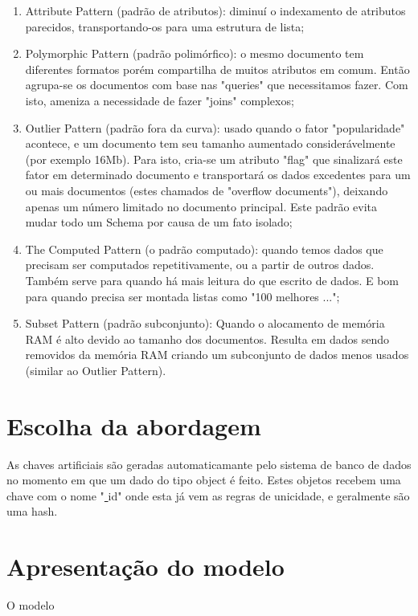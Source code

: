\documentclass[
	12pt,				%
	openright,			%
	oneside,			%
	a4paper,			%
	english,			%
	french,				%
	spanish,			%
	brazil,				%
	]{abntex2}
\newcommand{\under}{\underline{ }}
\begin{document}
\begin{enumerate}
  \item Attribute Pattern (padrão de atributos): diminuí o indexamento de atributos parecidos, transportando-os para uma estrutura de lista;
  \item Polymorphic Pattern (padrão polimórfico): o mesmo documento tem diferentes formatos porém compartilha de muitos atributos em comum. Então agrupa-se os documentos com base nas "queries" que necessitamos fazer. Com isto, ameniza a necessidade de fazer "joins" complexos;
  \item Outlier Pattern (padrão fora da curva): usado quando o fator "popularidade" acontece, e um documento tem seu tamanho aumentado considerávelmente (por exemplo 16Mb). Para isto, cria-se um atributo "flag" que sinalizará este fator em determinado documento e transportará os dados excedentes para um ou mais documentos (estes chamados de "overflow documents"), deixando apenas um número limitado no documento principal. Este padrão evita mudar todo um Schema por causa de um fato isolado;
  \item The Computed Pattern (o padrão computado): quando temos dados que precisam ser computados repetitivamente, ou a partir de outros dados. Também serve para quando há mais leitura do que escrito de dados. E bom para quando precisa ser montada listas como "100 melhores ...";
  \item Subset Pattern (padrão subconjunto): Quando o alocamento de memória RAM é alto devido ao tamanho dos documentos. Resulta em dados sendo removidos da memória RAM criando um subconjunto de dados menos usados (similar ao Outlier Pattern).
\end{enumerate}

\chapter{Escolha da abordagem}
As chaves artificiais são geradas automaticamante pelo sistema de banco de dados no momento em que um dado do tipo object é feito. Estes objetos recebem uma chave com o nome "{\under}id" onde esta já vem as regras de unicidade, e geralmente são uma hash.

\chapter{Apresentação do modelo}
O modelo
\end{document}

